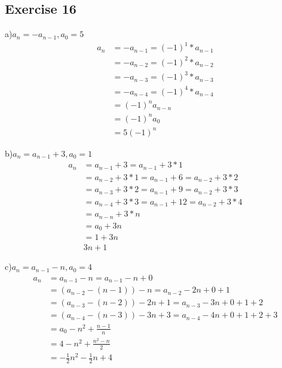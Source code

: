 \documentclass[12pt]{article}
\begin{document}
\subsection*{Exercise 16}
a)$a_{n}=-a_{n-1},a_0=5$\\
\begin{equation}\nonumber
    \begin{split}
        a_n&=-a_{n-1}=(-1)^1*a_{n-1}\\
        &=-a_{n-2}=(-1)^2*a_{n-2}\\
        &=-a_{n-3}=(-1)^3*a_{n-3}\\
        &=-a_{n-4}=(-1)^4*a_{n-4}\\
        &=(-1)^na_{n-n}\\
        &=(-1)^na_0\\
        &=5(-1)^n
    \end{split}
\end{equation}

b)$a_{n}=a_{n-1}+3,a_0=1$\\
\begin{equation}\nonumber
    \begin{split}
        a_n&=a_{n-1}+3=a_{n-1}+3*1\\
        &=a_{n-2}+3*1=a_{n-1}+6=a_{n-2}+3*2\\
        &=a_{n-3}+3*2=a_{n-1}+9=a_{n-2}+3*3\\
        &=a_{n-4}+3*3=a_{n-1}+12=a_{n-2}+3*4\\
        &=a_{n-n}+3*n\\
        &=a_0+3n\\
        &=1+3n\\
        &3n+1
    \end{split}
\end{equation}

c)$a_{n}=a_{n-1}-n,a_0=4$\\
\begin{equation}\nonumber
    \begin{split}
        a_n&=a_{n-1}-n=a_{n-1}-n+0\\
        &=(a_{n-2}-(n-1))-n=a_{n-2}-2n+0+1\\
        &=(a_{n-3}-(n-2))-2n+1=a_{n-3}-3n+0+1+2\\
        &=(a_{n-4}-(n-3))-3n+3=a_{n-4}-4n+0+1+2+3\\
        &=a_0-n^2+\frac{n-1}{n}\\
        &=4-n^2+\frac{n^2-n}{2}\\
        &=-\frac{1}{2}n^2-\frac{1}{2}n+4
    \end{split}
\end{equation}
\end{document}
